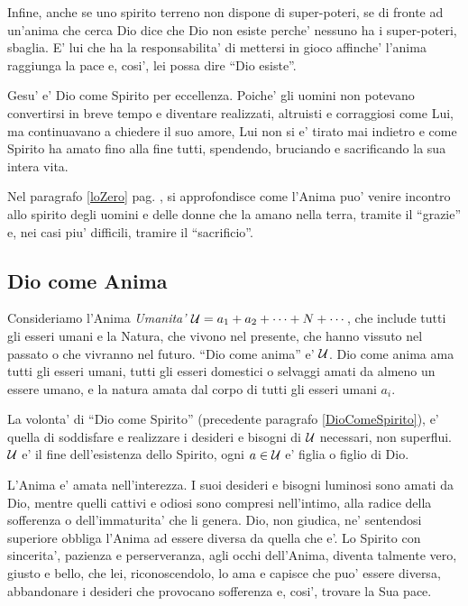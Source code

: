     Infine, anche se uno spirito terreno non dispone di super-poteri, se di fronte ad un'anima che cerca Dio dice che Dio non esiste perche' nessuno ha i super-poteri, sbaglia. E' lui che ha la responsabilita' di mettersi in gioco affinche' l'anima raggiunga la pace e, cosi', lei possa dire ``Dio esiste''.

Gesu' e' Dio come Spirito per eccellenza. Poiche' gli uomini non potevano convertirsi in breve tempo e diventare realizzati, altruisti e corraggiosi come Lui, ma continuavano a chiedere il suo amore, Lui non si e' tirato mai indietro e come Spirito ha amato fino alla fine tutti, spendendo, bruciando e sacrificando la sua intera vita.

 Nel paragrafo \ref{loZero} pag. \pageref{loZero}, si approfondisce come l'Anima puo' venire incontro allo spirito degli uomini e delle donne che la amano nella terra, tramite il ``grazie'' e, nei casi piu' difficili, tramire il ``sacrificio''. 


\subsection{Dio come Anima}
\label{PureSoulAsGod}
\label{SecondaDefinizioneDio}

Consideriamo l'Anima \emph{Umanita'} $\mathcal{U}=a_1+a_2+\cdots+N+\cdots$, che include tutti gli esseri umani e la Natura, che vivono nel presente, che hanno vissuto nel passato o che vivranno nel futuro. ``Dio come anima'' e' $\mathcal{U}$. Dio come anima ama tutti gli esseri umani, tutti gli esseri domestici o selvaggi amati da almeno un essere umano, e la natura amata dal corpo di tutti gli esseri umani $a_i$.

La volonta' di ``Dio come Spirito'' (precedente paragrafo \ref{DioComeSpirito}), e' quella di soddisfare e realizzare i desideri e bisogni di $\mathcal{U}$ necessari, non superflui. $\mathcal{U}$ e' il fine dell'esistenza dello Spirito, ogni $a\in \mathcal{U}$ e' figlia o figlio di Dio.

L'Anima e' amata nell'interezza. I suoi desideri e bisogni luminosi sono amati da Dio, mentre quelli cattivi e odiosi sono compresi nell'intimo, alla radice della sofferenza o dell'immaturita' che li genera. Dio, non giudica, ne' sentendosi superiore obbliga l'Anima ad essere diversa da quella che e'. Lo Spirito con sincerita', pazienza e perserveranza, agli occhi dell'Anima, diventa talmente vero, giusto e bello, che lei, riconoscendolo, lo ama e capisce che puo' essere diversa, abbandonare i desideri che provocano sofferenza e, cosi', trovare la Sua pace.

